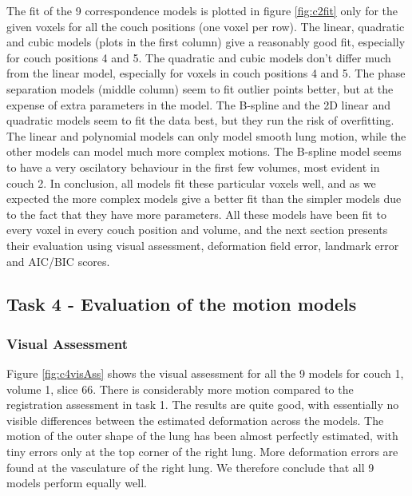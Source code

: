 \documentclass[11pt,a4paper,oneside]{report}
\begin{document}
The fit of the 9 correspondence models is plotted in figure \ref{fig:c2fit} only for the given voxels for all the couch positions (one voxel per row). The linear, quadratic and cubic models (plots in the first column) give a reasonably good fit, especially for couch positions 4 and 5. The quadratic and cubic models don't differ much from the linear model, especially for voxels in couch positions 4 and 5. The phase separation models (middle column) seem to fit outlier points better, but at the expense of extra parameters in the model. The B-spline and the 2D linear and quadratic models seem to fit the data best, but they run the risk of overfitting. The linear and polynomial models can only model smooth lung motion, while the other models can model much more complex motions. The B-spline model seems to have a very oscilatory behaviour in the first few volumes, most evident in couch 2. In conclusion, all models fit these particular voxels well, and as we expected the more complex models give a better fit than the simpler models due to the fact that they have more parameters. All these models have been fit to every voxel in every couch position and volume, and the next section presents their evaluation using visual assessment, deformation field error, landmark error and AIC/BIC scores.

\subsection*{Task 4 - Evaluation of the motion models}

\subsubsection*{Visual Assessment}

Figure \ref{fig:c4visAss} shows the visual assessment for all the 9 models for couch 1, volume 1, slice 66. There is considerably more motion compared to the registration assessment in task 1. The results are quite good, with essentially no visible differences between the estimated deformation across the models. The motion of the outer shape of the lung has been almost perfectly estimated, with tiny errors only at the top corner of the right lung. More deformation errors are found at the vasculature of the right lung. We therefore conclude that all 9 models perform equally well.
\end{document}
